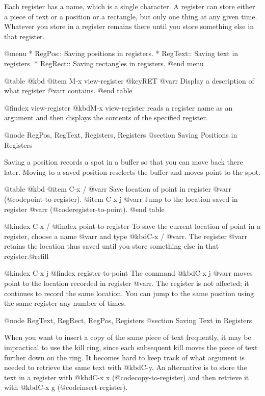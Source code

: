 {{{{{{{{  Each register has a name, which is a single character.  A register can
store either a piece of text or a position or a rectangle, but only one
thing at any given time.  Whatever you store in a register remains
there until you store something else in that register.

@menu
* RegPos::    Saving positions in registers.
* RegText::   Saving text in registers.
* RegRect::   Saving rectangles in registers.
@end menu

@table @kbd
@item M-x view-register @key{RET} @var{r}
Display a description of what register @var{r} contains.
@end table

@findex view-register
  @kbd{M-x view-register} reads a register name as an argument and then
displays the contents of the specified register.

@node RegPos, RegText, Registers, Registers
@section Saving Positions in Registers

  Saving a position records a spot in a buffer so that you can move
back there later.  Moving to a saved position reselects the buffer
and moves point to the spot.

@table @kbd
@item C-x / @var{r}
Save location of point in register @var{r} (@code{point-to-register}).
@item C-x j @var{r}
Jump to the location saved in register @var{r} (@code{register-to-point}).
@end table

@kindex C-x /
@findex point-to-register
  To save the current location of point in a register, choose a name
@var{r} and type @kbd{C-x / @var{r}}.  The register @var{r} retains
the location thus saved until you store something else in that
register.@refill

@kindex C-x j
@findex register-to-point
  The command @kbd{C-x j @var{r}} moves point to the location recorded
in register @var{r}.  The register is not affected; it continues to
record the same location.  You can jump to the same position using the
same register any number of times.

@node RegText, RegRect, RegPos, Registers
@section Saving Text in Registers

  When you want to insert a copy of the same piece of text frequently, it
may be impractical to use the kill ring, since each subsequent kill moves
the piece of text further down on the ring.  It becomes hard to keep track
of what argument is needed to retrieve the same text with @kbd{C-y}.  An
alternative is to store the text in a register with @kbd{C-x x}
(@code{copy-to-register}) and then retrieve it with @kbd{C-x g}
(@code{insert-register}).

}}}}}}}}
